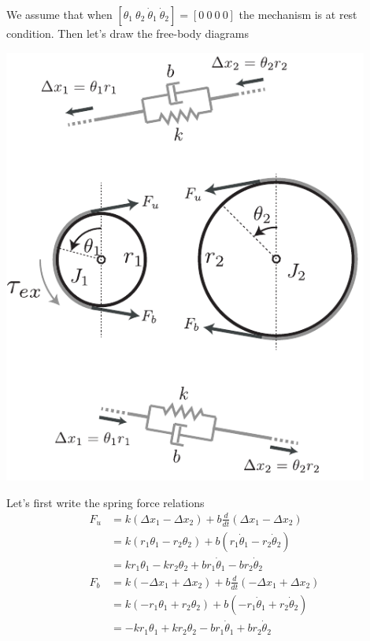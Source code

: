 \documentclass[twoside]{article}
\theoremstyle{definition}
\begin{document}
We assume that when $[ \theta_1 \ \theta_2 \ \dot{\theta}_1
      \ \dot{\theta}_2 ] = [0 \ 0 \ 0 \ 0]$ the mechanism is at rest
      condition. Then let's draw the free-body diagrams
    
    \vspace{12pt}
    
\begin{minipage}[h]{1\linewidth}
    \begin{center}
      \includegraphics[width=0.9\textwidth]{beltpulleyelastic_sol}
    \end{center}
\end{minipage}

\vspace{12pt}

Let's first write the spring force relations
%
\begin{align*}
  F_u &= k \left( \Delta x_1 - \Delta x_2 \right) + b \frac{d}{d t}
        \left( \Delta x_1 - \Delta x_2 \right)
  \\
    &= k \left(r_1 \theta_1 -r_2 \theta_2 \right) + b  \left( r_1
      \dot{\theta}_1 - r_2 \dot{\theta}_2 \right)
\\
    &= k r_1 \theta_1 - k r_2 \theta_2 + b r_1 \dot{\theta}_1 - b r_2
      \dot{\theta}_2
\\
  F_b &= k \left( -\Delta x_1 + \Delta x_2 \right) + b \frac{d}{d t}
        \left( -\Delta x_1 + \Delta x_2 \right)
  \\
    &= k \left(-r_1 \theta_1 + r_2 \theta_2 \right) + b  \left( -r_1
      \dot{\theta}_1 + r_2 \dot{\theta}_2 \right)
\\
    &= -k r_1 \theta_1 + k r_2 \theta_2 - b r_1 \dot{\theta}_1 + b r_2
      \dot{\theta}_2
\end{align*}
\end{document}
